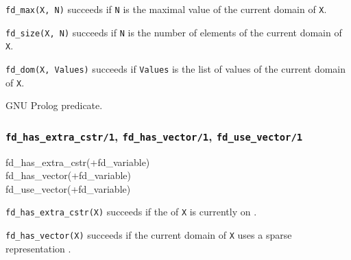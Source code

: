 \texttt{fd\_max(X, N)} succeeds if \texttt{N} is the maximal value of the
current domain of \texttt{X}.

\texttt{fd\_size(X, N)} succeeds if \texttt{N} is the number of elements of
the current domain of \texttt{X}.

\texttt{fd\_dom(X, Values)} succeeds if \texttt{Values} is the list of
values of the current domain of \texttt{X}.

\begin{PlErrors}






\end{PlErrors}

\Portability

GNU Prolog predicate.

\subsubsection{\texttt{fd\_has\_extra\_cstr/1},
               \texttt{fd\_has\_vector/1},
               \texttt{fd\_use\_vector/1}}

\begin{TemplatesOneCol}
fd\_has\_extra\_cstr(+fd\_variable)\\
fd\_has\_vector(+fd\_variable)\\
fd\_use\_vector(+fd\_variable)

\end{TemplatesOneCol}

\Description

\texttt{fd\_has\_extra\_cstr(X)} succeeds if the 
of \texttt{X} is currently on .

\texttt{fd\_has\_vector(X)} succeeds if the current domain of \texttt{X}
uses a sparse representation .

